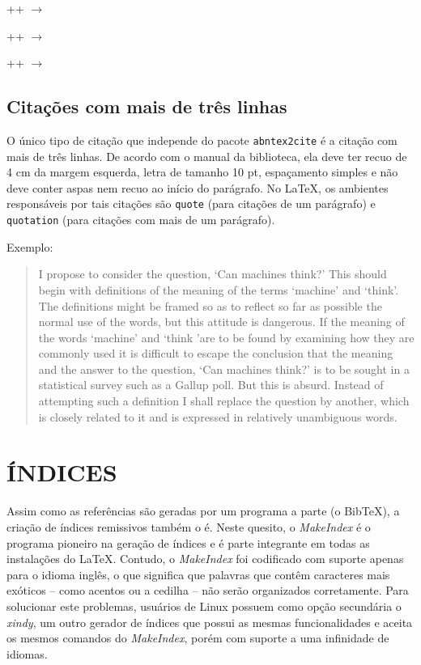 \documentclass[xindy,draft]{fei}
\begin{document}
	\latexinline++ \(\to\) 

	\latexinline++ \(\to\) 

	\latexinline++ \(\to\) 
	
	\section{Citações com mais de três linhas}
	
	O único tipo de citação que independe do pacote \texttt{abntex2cite} é a citação com mais de três linhas. De acordo com o manual da biblioteca, ela deve ter recuo de 4 cm da margem esquerda, letra de tamanho 10 pt, espaçamento simples e não deve conter aspas nem recuo ao início do parágrafo. No \LaTeX, os ambientes responsáveis por tais citações são \texttt{quote} (para citações de um parágrafo) e \texttt{quotation} (para citações com mais de um parágrafo).
	
	Exemplo:
	
	\begin{quote}		
	I propose to consider the question, `Can machines think?' This should begin with definitions of the meaning of the terms `machine' and `think'. The definitions might be framed so as to reflect so far as possible the normal use of the words, but this attitude is dangerous. If the meaning of the words `machine' and `think 'are to be found by examining how they are commonly used it is difficult to escape the conclusion that the meaning and the answer to the question, `Can machines think?' is to be sought in a statistical survey such as a Gallup poll. But this is absurd. Instead of attempting such a definition I shall replace the question by another, which is closely related to it and is expressed in relatively unambiguous words. \cite{j:turing50}
	\end{quote}

	\chapter{ÍNDICES}\label{chap:indice}
	
	Assim como as referências são geradas por um programa a parte (o Bib\TeX), a criação de índices remissivos também o é. Neste quesito, o \emph{MakeIndex} é o programa pioneiro na geração de índices e é parte integrante em todas as instalações do \LaTeX. Contudo, o \emph{MakeIndex} foi codificado com suporte apenas para o idioma inglês, o que significa que palavras que contêm caracteres mais exóticos -- como acentos ou a cedilha -- não serão organizados corretamente. Para solucionar este problemas, usuários de Linux possuem como opção secundária o \emph{xindy}, um outro gerador de índices que possui as mesmas funcionalidades e aceita os mesmos comandos do \emph{MakeIndex}, porém com suporte a uma infinidade de idiomas.
	
\end{document}
